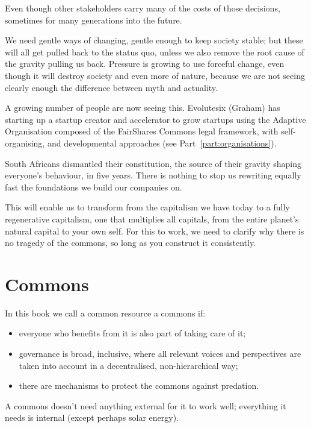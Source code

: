 Even though other stakeholders carry many of the costs of those decisions, sometimes for many generations into the future.


We need gentle ways of changing, gentle enough to keep society stable; but these will all get pulled back to the status quo, unless we also remove the root cause of the gravity pulling us back. Pressure is growing to use forceful change, even though it will destroy society and even more of nature, because we are not seeing clearly enough the difference between myth and actuality. 


A growing number of people are now seeing this. Evolutesix (Graham) has starting up a startup creator and accelerator to grow startups using the Adaptive Organisation composed of the FairShares Commons legal framework, with self-organising, and developmental approaches  (see Part~\ref{part:organisations}).


South Africans dismantled their constitution, the source of their gravity shaping everyone's behaviour, in five years. There is nothing to stop us rewriting equally fast the foundations we build our companies on.


This will enable us to transform from the capitalism we have today to a fully regenerative capitalism, one that multiplies all capitals, from the entire planet’s natural capital to your own self. For this to work, we need to clarify why there is no tragedy of the commons, so long as you construct it consistently.


\section{Commons}
\label{section:commons}


In this book we call a common resource a commons if:


\begin{itemize}
\item everyone who benefits from it is also part of taking care of it;
\item governance is broad, inclusive, where all relevant voices and perspectives are taken into account in a decentralised, non-hierarchical way;
        \item there are mechanisms to protect the commons against predation.
\end{itemize}


A commons doesn’t need anything external for it to work well; everything it needs is internal (except perhaps solar energy). 
